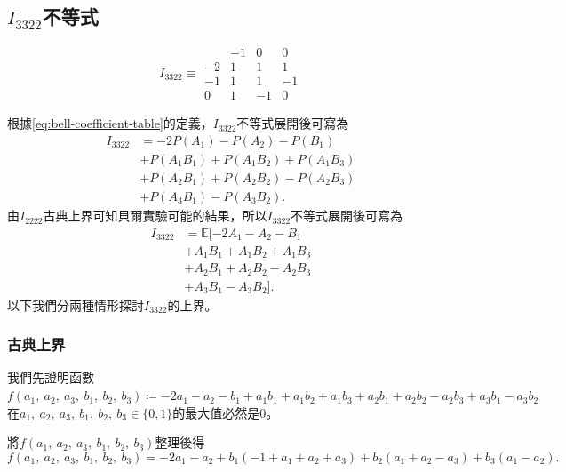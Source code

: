 \documentclass[12pt, a4paper, twoside, reqno]{article}
\begin{document}
\subsection{\texorpdfstring{$I_{3322}$}{I3322}不等式}
\begin{equation}
I_{3322}
\equiv
\begin{array}{c|ccc}
    & -1 & 0 & 0\\
    \hline
    -2 & 1 & 1 & 1\\
    -1 & 1 & 1 & -1\\
     0 & 1 & -1 & 0
\end{array}
\label{eq:I3322-table}
\end{equation}

\noindent 根據\eqref{eq:bell-coefficient-table}的定義，$I_{3322}$不等式展開後可寫為
\begin{equation}
\begin{aligned}
    I_{3322}
    &=
    -2P(A_1)-P(A_2)-P(B_1)\\
    &+ 
    P(A_1B_1)+P(A_1B_2)+P(A_1B_3)\\
    &+
    P(A_2B_1)+P(A_2B_2)-P(A_2B_3)\\
    &+
    P(A_3B_1)-P(A_3B_2).
    \label{eq:I3322-inequality}
\end{aligned}
\end{equation}
\noindent 由$I_{2222}$古典上界可知貝爾實驗可能的結果，所以$I_{3322}$不等式展開後可寫為
\begin{equation}
    \begin{aligned}
        I_{3322}
        &=\mathbb{E}[
        -2A_1-A_2-B_1\\
        &+ 
        A_1B_1+A_1B_2+A_1B_3\\
        &+
        A_2B_1+A_2B_2-A_2B_3\\
        &+
        A_3B_1-A_3B_2].
    \end{aligned}
\end{equation}
以下我們分兩種情形探討$I_{3322}$的上界。

\subsubsection{古典上界}
我們先證明函數$f(a_1,~a_2,~a_3,~b_1,~b_2,~b_3)\coloneq - 2a_1 - a_2 - b_1 + a_1b_1 + a_1b_2 + a_1b_3 +a_2b_1 + a_2b_2 - a_2b_3 + a_3b_1 - a_3b_2$在$a_1,~a_2,~a_3,~b_1,~b_2,~b_3 \in \{0,1\}$的最大值必然是0。

\noindent 將$f(a_1,~a_2,~a_3,~b_1,~b_2,~b_3)$整理後得
\[
    f(a_1,~a_2,~a_3,~b_1,~b_2,~b_3) = -2a_1 - a_2 + b_1(-1+a_1+a_2+a_3) + b_2(a_1+a_2-a_3) + b_3(a_1-a_2).
\]
\end{document}

